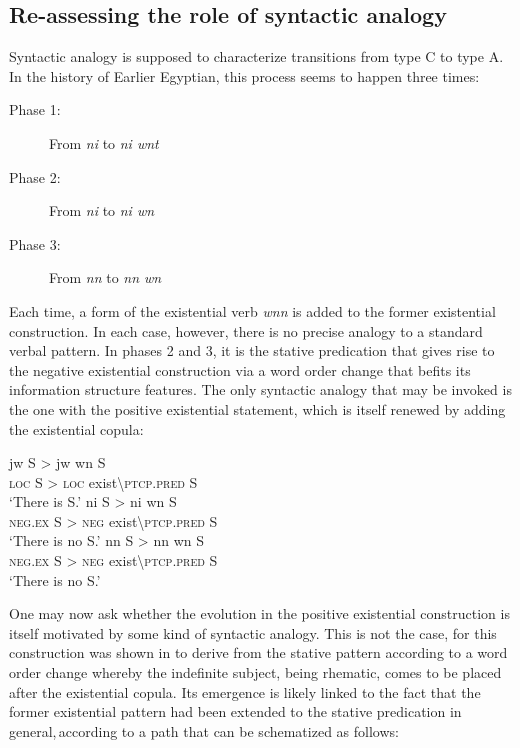 \documentclass[output=paper,draft,draftmode,colorlinks,citecolor=brown]{langscibook}
\begin{document}
\subsection{Re-assessing the role of syntactic analogy}\label{s:AE4-1}

Syntactic analogy is supposed to characterize transitions from type C to type A. In the history of Earlier Egyptian, this process seems to happen three times:

\begin{description}
    \item[Phase 1:] From \textit{ni} to \textit{ni wnt}
    \item[Phase 2:] From \textit{ni} to \textit{ni wn} 
    \item[Phase 3:] From \textit{nn} to \textit{nn wn} 
\end{description}
 
Each time, a form of the existential verb \textit{wnn} is added to the former existential construction. In each case, however, there is no precise analogy to a standard verbal pattern. In phases 2 and 3, it is the stative predication that gives rise to the negative existential construction via a word order change that befits its information structure features. The only syntactic analogy that may be invoked is the one with the positive existential statement, which is itself renewed by adding the existential copula:  

\ea 
    \ea \label{ex:AE53a}
    \gll jw S > jw wn S\\
    \textsc{loc} S > \textsc{loc} exist\textbackslash\textsc{ptcp.pred} S\\ 
    \glt ‘There is S.’ 
    \ex \label{ex:AE53b}
    \gll ni S > ni wn S\\
    \textsc{neg.ex} S > \textsc{neg} exist\textbackslash\textsc{ptcp.pred} S\\
    \glt ‘There is no S.’ 
    \ex \label{ex:AE53ac}
    \gll nn S > nn wn S\\ 
    \textsc{neg.ex} S > \textsc{neg} exist\textbackslash\textsc{ptcp.pred} S\\ 
    \glt ‘There is no S.’
\z \z


One may now ask whether the evolution in the positive existential construction is itself motivated by some kind of syntactic analogy. This is not the case, for this construction was shown in  to derive from the stative pattern according to a word order change whereby the indefinite subject, being rhematic, comes to be placed after the existential copula. Its emergence is likely linked to the fact that the former existential pattern had been extended to the stative predication in general, according to a path that can be schematized as follows:
\end{document}
